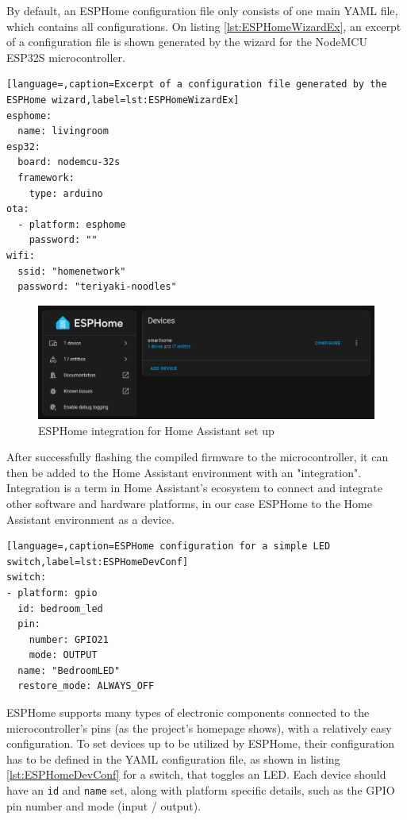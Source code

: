 By default, an ESPHome configuration file only consists of one main YAML file, which contains all configurations. On listing \ref{lst:ESPHomeWizardEx}, an excerpt of a configuration file is shown generated by the wizard for the NodeMCU ESP32S microcontroller.

\begin{lstlisting}[language=,caption=Excerpt of a configuration file generated by the ESPHome wizard,label=lst:ESPHomeWizardEx]
esphome:
  name: livingroom
esp32:
  board: nodemcu-32s
  framework:
    type: arduino
ota:
  - platform: esphome
    password: ""
wifi:
  ssid: "homenetwork"
  password: "teriyaki-noodles"
\end{lstlisting}

\begin{figure}[!ht]
  \centering
  \includegraphics[width=140mm, keepaspectratio]{figures/homeassistant_esphome_int.png}
  \caption{ESPHome integration for Home Assistant set up}
  \label{fig:HAesphomeint}
\end{figure}

After successfully flashing the compiled firmware to the microcontroller, it can then be added to the Home Assistant environment with an "integration". Integration is a term in Home Assistant's ecosystem to connect and integrate other software and hardware platforms, in our case ESPHome to the Home Assistant environment as a device. \cite{HAConceptsTerminology}

\begin{lstlisting}[language=,caption=ESPHome configuration for a simple LED switch,label=lst:ESPHomeDevConf]
switch:
- platform: gpio
  id: bedroom_led
  pin:
    number: GPIO21
    mode: OUTPUT
  name: "BedroomLED"
  restore_mode: ALWAYS_OFF
\end{lstlisting}

ESPHome supports many types of electronic components connected to the microcontroller's pins (as the project's homepage shows), with a relatively easy configuration. \cite{ESPHomeHomepage} To set devices up to be utilized by ESPHome, their configuration has to be defined in the YAML configuration file, as shown in listing \ref{lst:ESPHomeDevConf} for a switch, that toggles an LED. Each device should have an \verb+id+ and \verb+name+ set, along with platform specific details, such as the GPIO pin number and mode (input / output).


